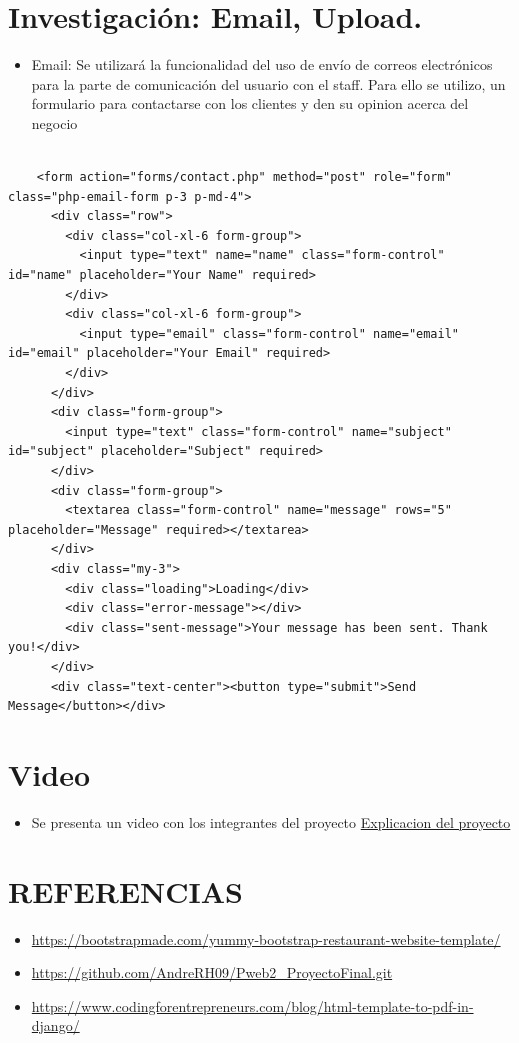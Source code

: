 \documentclass{article}
\begin{document}
\section{Investigación: Email, Upload.}
	\begin{itemize}
		\item Email: Se utilizará la funcionalidad del uso de envío de correos electrónicos para la parte de comunicación del usuario con el staff. Para ello se utilizo, un formulario para contactarse con los clientes y den su opinion acerca del negocio
	\end{itemize}
	\begin{lstlisting}

	<form action="forms/contact.php" method="post" role="form" class="php-email-form p-3 p-md-4">
	  <div class="row">
		<div class="col-xl-6 form-group">
		  <input type="text" name="name" class="form-control" id="name" placeholder="Your Name" required>
		</div>
		<div class="col-xl-6 form-group">
		  <input type="email" class="form-control" name="email" id="email" placeholder="Your Email" required>
		</div>
	  </div>
	  <div class="form-group">
		<input type="text" class="form-control" name="subject" id="subject" placeholder="Subject" required>
	  </div>
	  <div class="form-group">
		<textarea class="form-control" name="message" rows="5" placeholder="Message" required></textarea>
	  </div>
	  <div class="my-3">
		<div class="loading">Loading</div>
		<div class="error-message"></div>
		<div class="sent-message">Your message has been sent. Thank you!</div>
	  </div>
	  <div class="text-center"><button type="submit">Send Message</button></div>
	\end{lstlisting}
	
	\section{Video}
	\begin{itemize}			
		\item Se presenta un video con los integrantes del proyecto \href{https://drive.google.com/drive/folders/1n5q-sokJrMleBdvlblGO5rhaxiXWwcVs?usp=sharing}{Explicacion del proyecto}
	\end{itemize}

	\section{REFERENCIAS}
	
	\begin{itemize}			
		\item \url{https://bootstrapmade.com/yummy-bootstrap-restaurant-website-template/}
		\item \url{https://github.com/AndreRH09/Pweb2_ProyectoFinal.git}
		\item \url{https://www.codingforentrepreneurs.com/blog/html-template-to-pdf-in-django/}
	\end{itemize}	
	
%
%
%
			
\end{document}
